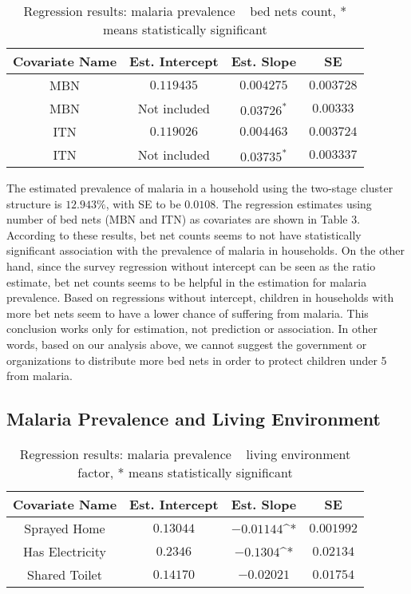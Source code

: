 \documentclass[11pt]{article}
\begin{document}
\begin{table}[h]
\centering
\small
 \begin{tabular}{c | c c c} 
 Covariate Name & Est. Intercept & Est. Slope & SE \\ 
 \hline
 MBN & $0.119435$ & $0.004275$ & $0.003728$ \\
 MBN & Not included & $0.03726^{*}$ & $0.00333$ \\
 ITN & $0.119026$ & $0.004463$ & $0.003724$ \\
 ITN & Not included & $0.03735^{*}$ & $0.003337$ \\
\end{tabular}
\caption{Regression results: malaria prevalence ~ bed nets count, {*} means statistically significant}
\label{tab:abc}
\end{table}

The estimated prevalence of malaria in a household using the two-stage cluster structure is $12.943\%$, with SE to be $0.0108$. The regression estimates using number of bed nets (MBN and ITN) as covariates are shown in Table 3. According to these results, bet net counts seems to not have statistically significant association with the prevalence of malaria in households. On the other hand, since the survey regression without intercept can be seen as the ratio estimate, bet net counts seems to be helpful in the estimation for malaria prevalence. Based on regressions without intercept, children in households with more bet nets seem to have a lower chance of suffering from malaria. This conclusion works only for estimation, not prediction or association. In other words, based on our analysis above, we cannot suggest the government or organizations to distribute more bed nets in order to protect children under 5 from malaria.   

\subsection{Malaria Prevalence and Living Environment}

\begin{table}[h]
\centering
\small
 \begin{tabular}{c | c c c} 
 Covariate Name & Est. Intercept & Est. Slope & SE \\ 
 \hline
 Sprayed Home & $0.13044$ & $-0.01144$^{*} & $0.001992$ \\
 Has Electricity & $0.2346$ & $-0.1304$^{*} & $0.02134$ \\
 Shared Toilet & $0.14170$ & $-0.02021$ & $0.01754$ \\
\end{tabular}
\caption{Regression results: malaria prevalence ~ living environment factor, {*} means statistically significant}
\label{tab:abc}
\end{table}
\end{document}
